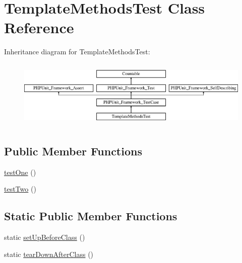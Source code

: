 \hypertarget{class_template_methods_test}{}\section{Template\+Methods\+Test Class Reference}
\label{class_template_methods_test}
Inheritance diagram for Template\+Methods\+Test\+:\begin{figure}[H]
\begin{center}
\leavevmode
\includegraphics[height=3.303835cm]{class_template_methods_test}
\end{center}
\end{figure}
\subsection*{Public Member Functions}
\begin{DoxyCompactItemize}
\item 
\mbox{\hyperlink{class_template_methods_test_afbf3ff88b322c6a7197ce02297cd23a0}{test\+One}} ()
\item 
\mbox{\hyperlink{class_template_methods_test_a4fb9974ce113d5d1db8075e0db0dc9b6}{test\+Two}} ()
\end{DoxyCompactItemize}
\subsection*{Static Public Member Functions}
\begin{DoxyCompactItemize}
\item 
static \mbox{\hyperlink{class_template_methods_test_a80ef9eb20e7443b38276fb4647985fb7}{set\+Up\+Before\+Class}} ()
\item 
static \mbox{\hyperlink{class_template_methods_test_a6256aa1772f8d1a6b16f1df662d94433}{tear\+Down\+After\+Class}} ()
\end{DoxyCompactItemize}
